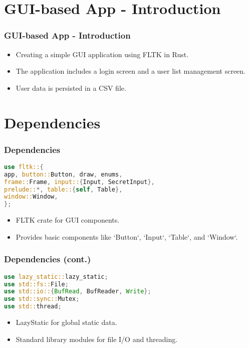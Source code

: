 \documentclass[aspectratio=169, table]{beamer}
\begin{document}
\section{GUI-based App - Introduction}
\begin{frame}
\frametitle{GUI-based App - Introduction}
\begin{itemize}
\item Creating a simple GUI application using FLTK in Rust.
\item The application includes a login screen and a user list management screen.
\item User data is persisted in a CSV file.
\end{itemize}
\end{frame}

\section{Dependencies}
\begin{frame}[fragile]
\frametitle{Dependencies}
\begin{lstlisting}[language=Rust]
use fltk::{
app, button::Button, draw, enums,
frame::Frame, input::{Input, SecretInput},
prelude::*, table::{self, Table},
window::Window,
};
\end{lstlisting}
\begin{itemize}
\item FLTK crate for GUI components.
\item Provides basic components like `Button`, `Input`, `Table`, and `Window`.
\end{itemize}
\end{frame}

\begin{frame}[fragile]
\frametitle{Dependencies (cont.)}
\begin{lstlisting}[language=Rust]
use lazy_static::lazy_static;
use std::fs::File;
use std::io::{BufRead, BufReader, Write};
use std::sync::Mutex;
use std::thread;
\end{lstlisting}
\begin{itemize}
\item LazyStatic for global static data.
\item Standard library modules for file I/O and threading.
\end{itemize}
\end{frame}
\end{document}
